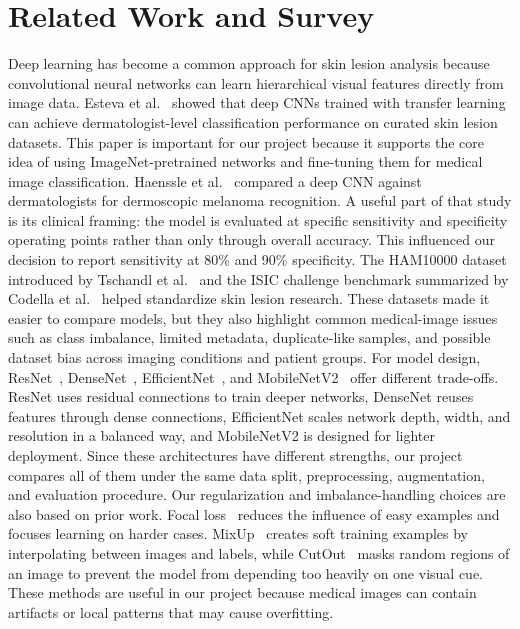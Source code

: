 \documentclass{article}
\begin{document}
\section{Related Work and Survey}
Deep learning has become a common approach for skin lesion analysis because convolutional neural
networks can learn hierarchical visual features directly from image data. Esteva et al.~\cite{esteva2017}
showed that deep CNNs trained with transfer learning can achieve dermatologist-level classification
performance on curated skin lesion datasets. This paper is important for our project because it
supports the core idea of using ImageNet-pretrained networks and fine-tuning them for medical
image classification.
Haenssle et al.~\cite{haenssle2018} compared a deep CNN against dermatologists for dermoscopic
melanoma recognition. A useful part of that study is its clinical framing: the model is evaluated at
specific sensitivity and specificity operating points rather than only through overall accuracy. This
influenced our decision to report sensitivity at 80\% and 90\% specificity.
The HAM10000 dataset introduced by Tschandl et al.~\cite{tschandl2018ham10000} and the ISIC
challenge benchmark summarized by Codella et al.~\cite{codella2019isic} helped standardize skin
lesion research. These datasets made it easier to compare models, but they also highlight common
medical-image issues such as class imbalance, limited metadata, duplicate-like samples, and possible
dataset bias across imaging conditions and patient groups.
For model design, ResNet~\cite{he2016resnet}, DenseNet~\cite{huang2017densenet},
EfficientNet~\cite{tan2019efficientnet}, and MobileNetV2~\cite{sandler2018mobilenetv2} offer
different trade-offs. ResNet uses residual connections to train deeper networks, DenseNet reuses
features through dense connections, EfficientNet scales network depth, width, and resolution in a
balanced way, and MobileNetV2 is designed for lighter deployment. Since these architectures have
different strengths, our project compares all of them under the same data split, preprocessing,
augmentation, and evaluation procedure.
Our regularization and imbalance-handling choices are also based on prior work. Focal
loss~\cite{lin2017focal} reduces the influence of easy examples and focuses learning on harder cases.
MixUp~\cite{zhang2018mixup} creates soft training examples by interpolating between images and
labels, while CutOut~\cite{devries2017cutout} masks random regions of an image to prevent the model
from depending too heavily on one visual cue. These methods are useful in our project because
medical images can contain artifacts or local patterns that may cause overfitting.
\end{document}
